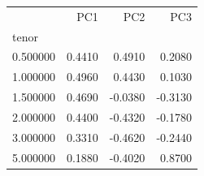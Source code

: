 \begin{tabular}{lrrr}
\toprule
 & PC1 & PC2 & PC3 \\
tenor &  &  &  \\
\midrule
0.500000 & 0.4410 & 0.4910 & 0.2080 \\
1.000000 & 0.4960 & 0.4430 & 0.1030 \\
1.500000 & 0.4690 & -0.0380 & -0.3130 \\
2.000000 & 0.4400 & -0.4320 & -0.1780 \\
3.000000 & 0.3310 & -0.4620 & -0.2440 \\
5.000000 & 0.1880 & -0.4020 & 0.8700 \\
\bottomrule
\end{tabular}
